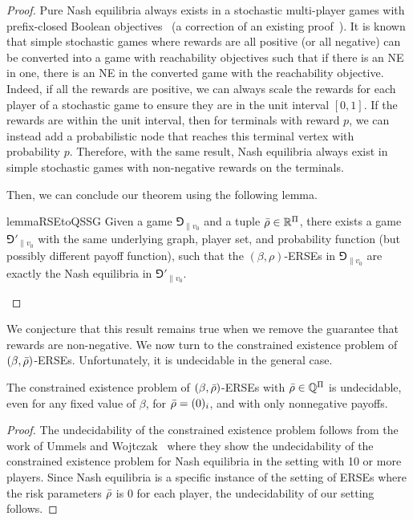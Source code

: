 \begin{proof}
 Pure Nash equilibria always exists in a stochastic multi-player games with prefix-closed Boolean objectives~\cite[Theorem 3.10]{Umm10} (a correction of an existing proof~\cite{CMJ04}). It is known that simple stochastic games where rewards are all positive (or all negative) can be converted into a game with reachability objectives such that if there is an NE in one, there is an NE in the converted game with the reachability objective. Indeed, if all the rewards are positive, we can always scale the rewards for each player of a stochastic game to ensure they are in the unit interval $[0,1]$. If the rewards are within the unit interval, then for terminals with reward $p$, we can instead add a probabilistic node that reaches this terminal vertex with probability $p$. 
Therefore, with the same result, Nash equilibria always exist in simple stochastic games with non-negative rewards on the terminals. 

Then, we can conclude our theorem using the following lemma.

\begin{restatable}{lemma}{RSEtoQSSG}\label{lemma:RSEtoQSSG}
Given a game $\Game_{\|v_0}$ and a tuple ${\bar{\rho}} \in \mathbb{R}^\Pi$, there exists a game $\Game'_{\|v_0}$ with the same underlying graph, player set, and probability function (but possibly different payoff function), such that the $(\beta,\rho)$-ERSEs in $\Game_{\|v_0}$ are exactly the Nash equilibria in $\Game'_{\|v_0}$. \qedhere
\end{restatable}
\end{proof}

We conjecture that this result remains true when we remove the guarantee that rewards are non-negative.
We now turn to the constrained existence problem of $\left( \beta,{\bar{\rho}} \right)$-ERSEs.
Unfortunately, it is undecidable in the general case.

\begin{proposition}\label{proposition:Undecidable}
    The constrained existence problem of $\left( \beta,{\bar{\rho}} \right)$-ERSEs with ${\bar{\rho}} \in \mathbb{Q}^{\Pi}$ is undecidable, even for any fixed value of $\beta$, for ${\bar{\rho}} = (0)_i$, and with only nonnegative payoffs. %
\end{proposition}

\begin{proof}
         The undecidability of the constrained existence problem follows from the work of Ummels and Wojtczak~\cite[Theorem 4.9]{UW11} where they show the undecidability of the constrained existence problem for Nash equilibria in the setting with 10 or more players. Since Nash equilibria is a specific instance of the setting of ERSEs where the risk parameters ${\bar{\rho}}$ is $0$ for each player, the undecidability of our setting follows. 
\end{proof}

